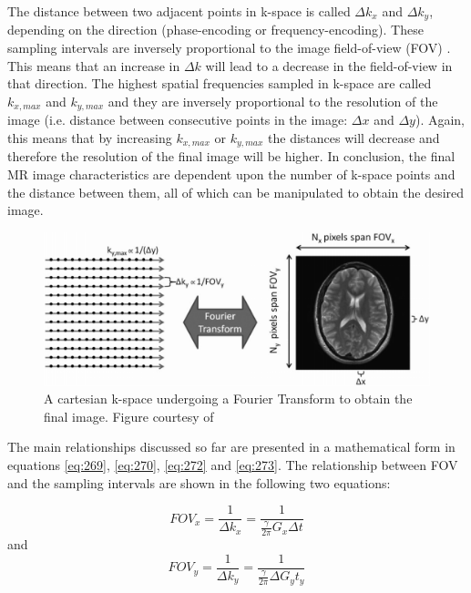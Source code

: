 The distance between two adjacent points in k-space is called $\Delta k_x$ and $\Delta k_y$, depending on the direction (phase-encoding or frequency-encoding). These sampling intervals are inversely proportional to the image field-of-view (FOV) \cite{Deshmane2012}. This means that an increase in $\Delta k$ will lead to a decrease in the field-of-view in that direction. The highest spatial frequencies sampled in k-space are called $k_{x,max}$ and $k_{y,max}$ and they are inversely proportional to the resolution of the image (i.e. distance between consecutive points in the image: $\Delta x$ and $\Delta y$). Again, this means that by increasing $k_{x,max}$ or $k_{y,max}$ the distances will decrease and therefore the resolution of the final image will be higher. In conclusion, the final MR image characteristics are dependent upon the number of k-space points and the distance between them, all of which can be manipulated to obtain the desired image. 

\begin{figure}[ht]
    \centering
    \includegraphics[width=1\textwidth,keepaspectratio]{reconstruction}
    \caption{A cartesian k-space undergoing a Fourier Transform to obtain the final image. Figure courtesy of \cite{Deshmane2012}}
    \label{fig:reconstruction}
\end{figure}

The main relationships discussed so far are presented in a mathematical form in equations \ref{eq:269}, \ref{eq:270}, \ref{eq:272} and \ref{eq:273}. The relationship between FOV and the sampling intervals are shown in the following two equations:

\begin{equation} \label{eq:269}
    FOV_x = \frac{1}{\Delta k_x} = \frac{1}{\frac{\gamma}{2 \pi} G_x \Delta t}
\end{equation}
and
\begin{equation} \label{eq:270}
    FOV_y = \frac{1}{\Delta k_y} = \frac{1}{\frac{\gamma}{2 \pi} \Delta G_y t_y}
\end{equation}

